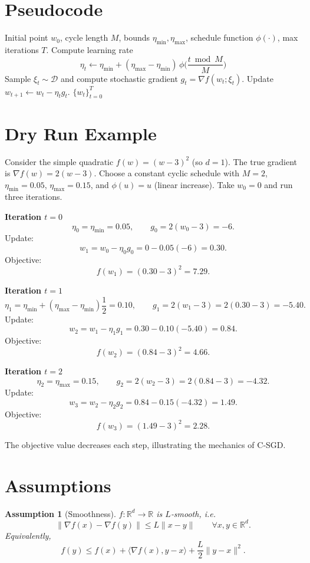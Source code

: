 \documentclass[11pt]{article}
\newtheorem{assumption}{Assumption}[section]
\begin{document}
\section*{Pseudocode}
\begin{algorithm}[H]
\caption{Cyclic Stochastic Gradient Descent (C‑SGD)}
\begin{algorithmic}[1]
\REQUIRE Initial point $w_0$, cycle length $M$, bounds $\eta_{\min},\eta_{\max}$, schedule function $\phi(\cdot)$, max iterations $T$.
    \STATE Compute learning rate 
    \[
    \eta_t \gets \eta_{\min}+(\eta_{\max}-\eta_{\min})\,
           \phi\!\Big(\frac{t\bmod M}{M}\Big)
    \]
    \STATE Sample $\xi_t\sim\mathcal{D}$ and compute stochastic gradient $g_t=\nabla f(w_t;\xi_t)$.
    \STATE Update $w_{t+1}\gets w_t-\eta_t g_t$.
\ENDFOR
\RETURN $\{w_t\}_{t=0}^T$
\end{algorithmic}
\end{algorithm}

\section*{Dry Run Example}
Consider the simple quadratic $f(w)=(w-3)^2$ (so $d=1$).  
The true gradient is $\nabla f(w)=2(w-3)$.  
Choose a constant cyclic schedule with $M=2$, $\eta_{\min}=0.05$, $\eta_{\max}=0.15$, and $\phi(u)=u$ (linear increase).  
Take $w_0=0$ and run three iterations.

\medskip
\noindent\textbf{Iteration $t=0$}
\[
\eta_0=\eta_{\min}=0.05,\qquad 
g_0=2(w_0-3)=-6.
\]
Update:
\[
w_1 = w_0-\eta_0 g_0 =0-0.05(-6)=0.30.
\]
Objective:
\[
f(w_1)=(0.30-3)^2=7.29.
\]

\noindent\textbf{Iteration $t=1$}
\[
\eta_1=\eta_{\min}+(\eta_{\max}-\eta_{\min})\frac{1}{2}=0.10,
\qquad 
g_1=2(w_1-3)=2(0.30-3)=-5.40.
\]
Update:
\[
w_2 = w_1-\eta_1 g_1 =0.30-0.10(-5.40)=0.84.
\]
Objective:
\[
f(w_2)=(0.84-3)^2=4.66.
\]

\noindent\textbf{Iteration $t=2$}
\[
\eta_2=\eta_{\max}=0.15,\qquad 
g_2=2(w_2-3)=2(0.84-3)=-4.32.
\]
Update:
\[
w_3 = w_2-\eta_2 g_2 =0.84-0.15(-4.32)=1.49.
\]
Objective:
\[
f(w_3)=(1.49-3)^2=2.28.
\]

The objective value decreases each step, illustrating the mechanics of C‑SGD.

\newpage
\section*{Assumptions}
\begin{assumption}[Smoothness]\label{as:smooth}
$f:\mathbb{R}^d\to\mathbb{R}$ is $L$‑smooth, i.e.
\[
\|\nabla f(x)-\nabla f(y)\|\le L\|x-y\|\qquad\forall x,y\in\mathbb{R}^d .
\]
Equivalently,
\[
f(y)\le f(x)+\langle\nabla f(x),y-x\rangle+\frac{L}{2}\|y-x\|^2 .
\tag{A1}
\]
\end{assumption}
\end{document}
